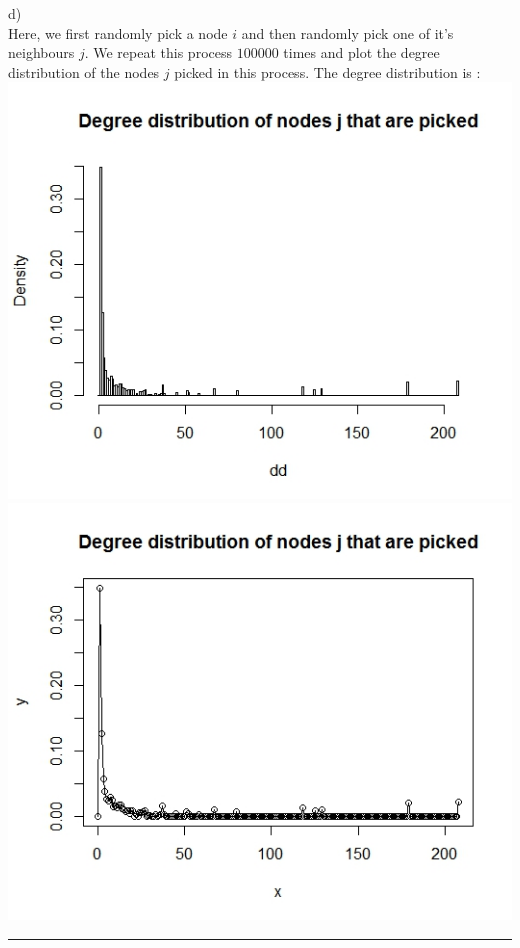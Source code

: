 \documentclass{article}
\begin{document}
d)\\
Here, we first randomly pick a node $i$ and then randomly pick one of it's neighbours $j$. We repeat this process 
$100000$ times and plot the degree distribution of the nodes $j$ picked in this process. The degree distribution is :\\
\includegraphics[scale=0.4]{pb6} \\
\includegraphics[scale=0.4]{pb7} \\

\hrule
\end{document}
